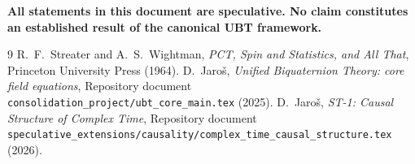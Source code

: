 \documentclass[12pt]{article}
\begin{document}
\medskip
\noindent\textbf{All statements in this document are speculative.  No
claim constitutes an established result of the canonical UBT framework.}


\begin{thebibliography}{9}
  R.~F.~Streater and A.~S.~Wightman,
  \emph{PCT, Spin and Statistics, and All That},
  Princeton University Press (1964).
  D.~Jaroš,
  \emph{Unified Biquaternion Theory: core field equations},
  Repository document \texttt{consolidation\_project/ubt\_core\_main.tex} (2025).
  D.~Jaroš,
  \emph{ST-1: Causal Structure of Complex Time},
  Repository document
  \texttt{speculative\_extensions/causality/complex\_time\_causal\_structure.tex} (2026).
\end{thebibliography}
\end{document}
